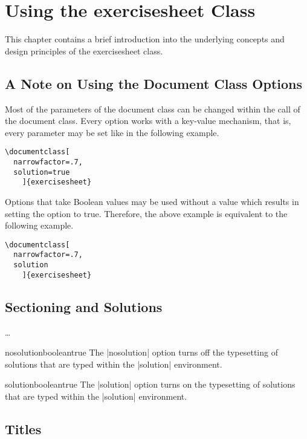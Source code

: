 \documentclass[a4paper,fleqn,9pt]{report}
\def\exercisesheet{{exercisesheet}}
\begin{document}



\chapter{Using the \exercisesheet{} Class}

This chapter contains a brief introduction into the underlying
concepts and design principles of the \exercisesheet{} class.


\section{A Note on Using the Document Class Options}

Most of the parameters of the document class can be changed within the
call of the document class. Every option works with a key-value
mechanism, that is, every parameter may be set like in the following
example.
\begin{lstlisting}
\documentclass[
  narrowfactor=.7,
  solution=true
    ]{exercisesheet}
\end{lstlisting}
Options that take Boolean values may be used without a value which
results in setting the option to true. Therefore, the above example
is equivalent to the following example.
\begin{lstlisting}
\documentclass[
  narrowfactor=.7,
  solution
    ]{exercisesheet}
\end{lstlisting}


\section{Sectioning and Solutions}

\ldots

\begin{documentoption}{nosolution}{boolean}{true}
  The |nosolution| option turns off the typesetting of
  solutions that are typed within the |solution|
  environment.
\end{documentoption}

\begin{documentoption}{solution}{boolean}{true}
  The |solution| option turns on the typesetting of
  solutions that are typed within the |solution|
  environment.
\end{documentoption}


\section{Titles}
\end{document}
